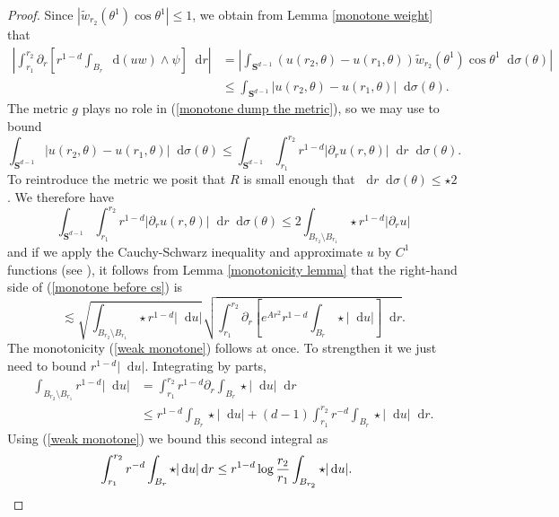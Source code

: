 \documentclass[reqno,12pt,letterpaper]{amsart}
\newcommand{\Sph}{\mathbf S}
\newcommand*\dif{\mathop{}\!\mathrm{d}}
\theoremstyle{definition}
\numberwithin{equation}{section}
\begin{document}
\begin{proof}
Since $|\tilde w_{r_2}(\theta^1) \cos \theta^1| \leq 1$, we obtain from Lemma \ref{monotone weight} that
\begin{align}
\left|\int_{r_1}^{r_2} \partial_r \left[r^{1 - d}\int_{B_r} \dif(uw) \wedge \psi\right] \dif r\right|
&= \left|\int_{\Sph^{d - 1}} (u(r_2, \theta) - u(r_1, \theta)) \tilde w_{r_2}(\theta^1) \cos \theta^1 \dif \sigma(\theta)\right| \\
&\leq \int_{\Sph^{d - 1}} |u(r_2, \theta) - u(r_1, \theta)| \dif \sigma(\theta). \label{monotone dump the metric}
\end{align}
The metric $g$ plays no role in (\ref{monotone dump the metric}), so we may use \cite[Lemma 5.3]{Giusti77} to bound
$$\int_{\Sph^{d - 1}} |u(r_2, \theta) - u(r_1, \theta)| \dif \sigma(\theta) \leq \int_{\Sph^{d - 1}} \int_{r_1}^{r_2} r^{1 - d}|\partial_r u(r, \theta)| \dif r \dif\sigma(\theta).$$
To reintroduce the metric we posit that $R$ is small enough that $\dif r \dif \sigma(\theta) \leq \star 2$.
We therefore have
\begin{equation}\label{monotone before cs}
\int_{\Sph^{d - 1}} \int_{r_1}^{r_2} r^{1 - d}|\partial_r u(r, \theta)| \dif r \dif\sigma(\theta) \leq 2 \int_{B_{r_2} \setminus B_{r_1}} \star r^{1 - d}|\partial_r u|
\end{equation}
and if we apply the Cauchy-Schwarz inequality and approximate $u$ by $C^1$ functions (see \cite[pg68]{Giusti77}), it follows from Lemma \ref{monotonicity lemma} that the right-hand side of (\ref{monotone before cs}) is
$$\lesssim \sqrt{\int_{B_{r_2} \setminus B_{r_1}} \star r^{1 - d} |\dif u|} \sqrt{\int_{r_1}^{r_2} \partial_r \left[e^{Ar^2} r^{1-d}\int_{B_r} \star |\dif u|\right] \dif r}.$$
The monotonicity (\ref{weak monotone}) follows at once. To strengthen it we just need to bound $r^{1 - d} |\dif u|$.
Integrating by parts,
\begin{align*}
\int_{B_{r_2} \setminus B_{r_1}} r^{1 - d} |\dif u| &= \int_{r_1}^{r_2} r^{1 - d} \partial_r \int_{B_r} \star |\dif u| \dif r \\
&\leq r^{1 - d} \int_{B_r} \star |\dif u| + (d - 1) \int_{r_1}^{r_2} r^{-d} \int_{B_r} \star |\dif u| \dif r.
\end{align*}
Using (\ref{weak monotone}) we bound this second integral as
\begin{align*}
\int_{r_1}^{r_2} r^{-d} \int_{B_r} \star |\dif u| \dif r &\leq r^{1 - d} \log \frac{r_2}{r_1} \int_{B_{r_2}} \star |\dif u|. \qedhere
\end{align*}
\end{proof}
\end{document}
